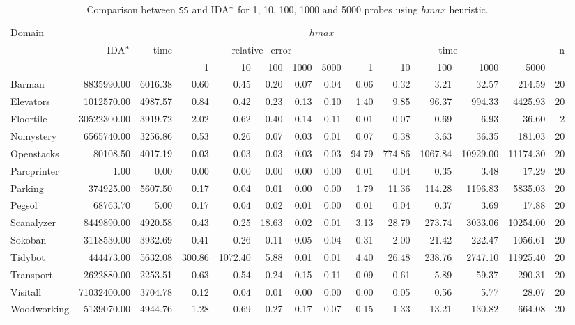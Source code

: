 \begin{table}[]
\tiny\setlength{\tabcolsep}{2pt}
\centering
\caption{Comparison between \texttt{SS} and IDA$\sp{*}$ for 1, 10, 100, 1000 and 5000 probes using $hmax$ heuristic.}
\label{tb:comparison}
\begin{tabular}{lrrrrrrrrrrrrr}
\hline
\multirow{3}{*}{Domain} & \multicolumn{13}{c}{$hmax$}                                                                                                                     \\ \cline{2-14} 
                        & \multirow{2}{*}{IDA$\sp{*}$} & \multirow{2}{*}{time} & \multicolumn{5}{c}{relative$-$error} & \multicolumn{5}{c}{time}   & \multirow{2}{*}{n} \\ \cline{4-13}
                        &                              &                       & 1   & 10   & 100   & 1000   & 5000   & 1 & 10 & 100 & 1000 & 5000 &                    \\ \hline
Barman & 8835990.00& 6016.38& 0.60& 0.45& 0.20& 0.07& 0.04& 0.06& 0.32& 3.21& 32.57& 214.59& 20\\
Elevators & 1012570.00& 4987.57& 0.84& 0.42& 0.23& 0.13& 0.10& 1.40& 9.85& 96.37& 994.33& 4425.93& 20\\
Floortile & 30522300.00& 3919.72& 2.02& 0.62& 0.40& 0.14& 0.11& 0.01& 0.07& 0.69& 6.93& 36.60& 2\\
Nomystery & 6565740.00& 3256.86& 0.53& 0.26& 0.07& 0.03& 0.01& 0.07& 0.38& 3.63& 36.35& 181.03& 20\\
Openstacks & 80108.50& 4017.19& 0.03& 0.03& 0.03& 0.03& 0.03& 94.79& 774.86& 1067.84& 10929.00& 11174.30& 20\\
Parcprinter & 1.00& 0.00& 0.00& 0.00& 0.00& 0.00& 0.00& 0.01& 0.04& 0.35& 3.48& 17.29& 20\\
Parking & 374925.00& 5607.50& 0.17& 0.04& 0.01& 0.00& 0.00& 1.79& 11.36& 114.28& 1196.83& 5835.03& 20\\
Pegsol & 68763.70& 5.00& 0.17& 0.04& 0.02& 0.01& 0.00& 0.01& 0.04& 0.37& 3.69& 17.88& 20\\
Scanalyzer & 8449890.00& 4920.58& 0.43& 0.25& 18.63& 0.02& 0.01& 3.13& 28.79& 273.74& 3033.06& 10254.00& 20\\
Sokoban & 3118530.00& 3932.69& 0.41& 0.26& 0.11& 0.05& 0.04& 0.31& 2.00& 21.42& 222.47& 1056.61& 20\\
Tidybot & 444473.00& 5632.08& 300.86& 1072.40& 5.88& 0.01& 0.01& 4.40& 26.48& 238.76& 2747.10& 11925.40& 20\\
Transport & 2622880.00& 2253.51& 0.63& 0.54& 0.24& 0.15& 0.11& 0.09& 0.61& 5.89& 59.37& 290.31& 20\\
Visitall & 71032400.00& 3704.78& 0.12& 0.04& 0.01& 0.00& 0.00& 0.00& 0.05& 0.56& 5.77& 28.07& 20\\
Woodworking & 5139070.00& 4944.76& 1.28& 0.69& 0.27& 0.17& 0.07& 0.15& 1.33& 13.21& 130.82& 664.08& 20\\ \hline
\end{tabular}
\end{table}

